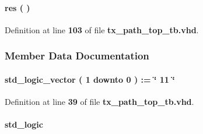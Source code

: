 \paragraph[{res}]{\setlength{\rightskip}{0pt plus 5cm} {\bfseries \textcolor{vhdlchar}{ }} res ( ) \hspace{0.3cm}{\ttfamily [Process]}}\label{classtx__path__top__tb_1_1tb__behave_ab0bd7560790c13b656fd58e17e35143e}


Definition at line {\bf 103} of file {\bf tx\+\_\+path\+\_\+top\+\_\+tb.\+vhd}.



\subsubsection{Member Data Documentation}
\paragraph[{ch\+\_\+en}]{ {\bfseries \textcolor{comment}{std\+\_\+logic\+\_\+vector}\textcolor{vhdlchar}{ }\textcolor{vhdlchar}{(}\textcolor{vhdlchar}{ }\textcolor{vhdlchar}{ } \textcolor{vhdldigit}{1} \textcolor{vhdlchar}{ }\textcolor{keywordflow}{downto}\textcolor{vhdlchar}{ }\textcolor{vhdlchar}{ } \textcolor{vhdldigit}{0} \textcolor{vhdlchar}{ }\textcolor{vhdlchar}{)}\textcolor{vhdlchar}{ }\textcolor{vhdlchar}{ }\textcolor{vhdlchar}{ }\textcolor{vhdlchar}{\+:}\textcolor{vhdlchar}{=}\textcolor{vhdlchar}{ }\textcolor{vhdlchar}{ }\textcolor{vhdlchar}{ }\textcolor{vhdlchar}{ }\textcolor{keyword}{\char`\"{} 11 \char`\"{}}\textcolor{vhdlchar}{ }} \hspace{0.3cm}{\ttfamily [Signal]}}\label{classtx__path__top__tb_1_1tb__behave_a1e134c20b9493590d25b7099d98704b4}


Definition at line {\bf 39} of file {\bf tx\+\_\+path\+\_\+top\+\_\+tb.\+vhd}.

\paragraph[{clk0}]{ {\bfseries \textcolor{comment}{std\+\_\+logic}\textcolor{vhdlchar}{ }} \hspace{0.3cm}{\ttfamily [Signal]}}\label{classtx__path__top__tb_1_1tb__behave_a693d72741b9413130fe2d67511b642be}



